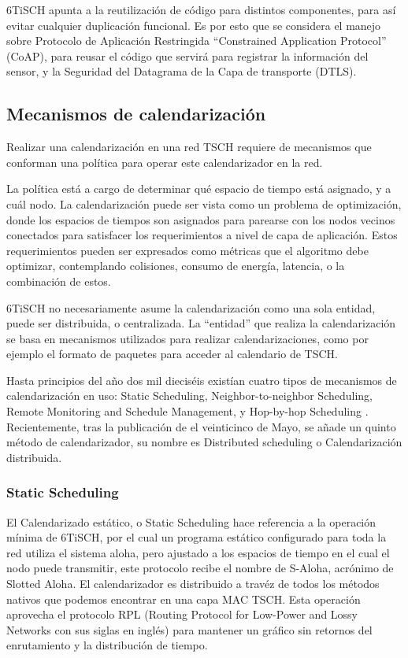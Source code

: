 6TiSCH apunta a la reutilización de código para distintos componentes, para así evitar cualquier duplicación funcional. Es por esto que se considera el manejo sobre Protocolo de Aplicación Restringida ``Constrained Application Protocol'' (CoAP), para reusar el código que servirá para registrar la información del sensor, y la Seguridad del Datagrama de la Capa de transporte (DTLS).

\subsection{Mecanismos de calendarización}

Realizar una calendarización en una red TSCH requiere de mecanismos que conforman una política para operar este calendarizador en la red.

La política está a cargo de determinar qué espacio de tiempo está asignado, y a cuál nodo. La calendarización puede ser vista como un problema de optimización, donde los espacios de tiempos son asignados para parearse con los nodos vecinos conectados para satisfacer los requerimientos a nivel de capa de aplicación. Estos requerimientos pueden ser expresados como métricas que el algoritmo debe optimizar, contemplando colisiones, consumo de energía, latencia, o la combinación de estos.

6TiSCH no necesariamente asume la calendarización como una sola entidad, puede ser distribuida, o centralizada. La ``entidad'' que realiza la calendarización se basa en mecanismos utilizados para realizar calendarizaciones, como por ejemplo el formato de paquetes para acceder al calendario de TSCH.

Hasta principios del año dos mil dieciséis existían cuatro tipos de mecanismos de calendarización en uso: Static Scheduling, Neighbor-to-neighbor Scheduling, Remote Monitoring and Schedule Management, y Hop-by-hop Scheduling \cite{ietf-6tisch-architecture-10}. Recientemente, tras la publicación de \cite{muraoka2016simple} el veinticinco de Mayo, se añade un quinto método de calendarizador, su nombre es Distributed scheduling o Calendarización distribuida.

\subsubsection{Static Scheduling}

El Calendarizado estático, o Static Scheduling hace referencia a la operación mínima de 6TiSCH, por el cual un programa estático configurado para toda la red utiliza el sistema aloha, pero ajustado a los espacios de tiempo en el cual el nodo puede transmitir, este protocolo recibe el nombre de S-Aloha, acrónimo de Slotted Aloha. El calendarizador es distribuido a travéz de todos los métodos nativos que podemos encontrar en una capa MAC TSCH. Esta operación aprovecha el protocolo RPL (Routing Protocol for Low-Power and Lossy Networks con sus siglas en inglés) para mantener un gráfico sin retornos del enrutamiento y la distribución de tiempo.


